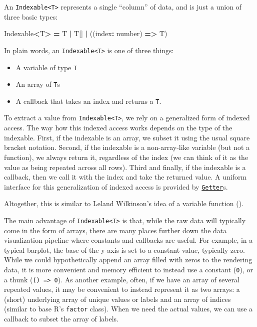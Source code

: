 \documentclass[
]{book}
\newenvironment{Shaded}{\begin{snugshade}}{\end{snugshade}}
\newcommand{\DataTypeTok}[1]{\textcolor[rgb]{0.13,0.29,0.53}{#1}}
\newcommand{\KeywordTok}[1]{\textcolor[rgb]{0.13,0.29,0.53}{\textbf{#1}}}
\newcommand{\NormalTok}[1]{#1}
\newcommand{\OperatorTok}[1]{\textcolor[rgb]{0.81,0.36,0.00}{\textbf{#1}}}
\providecommand{\tightlist}{%
  \setlength{\itemsep}{0pt}\setlength{\parskip}{0pt}}
\theoremstyle{definition}
\theoremstyle{definition}
\theoremstyle{definition}
\theoremstyle{definition}
\theoremstyle{remark}
\begin{document}
An \texttt{Indexable\textless{}T\textgreater{}} represents a single ``column'' of data, and is just a union of three basic types:

\begin{Shaded}
\begin{Highlighting}[]
\NormalTok{Indexable}\OperatorTok{\textless{}}\NormalTok{T}\OperatorTok{\textgreater{}} \OperatorTok{=}\NormalTok{ T }\OperatorTok{|}\NormalTok{ T[] }\OperatorTok{|}\NormalTok{ ((index}\OperatorTok{:} \DataTypeTok{number}\NormalTok{) }\KeywordTok{=\textgreater{}}\NormalTok{ T)}
\end{Highlighting}
\end{Shaded}

In plain words, an \texttt{Indexable\textless{}T\textgreater{}} is one of three things:

\begin{itemize}
\tightlist
\item
  A variable of type \texttt{T}
\item
  An array of \texttt{T}s
\item
  A callback that takes an index and returns a \texttt{T}.
\end{itemize}

To extract a value from \texttt{Indexable\textless{}T\textgreater{}}, we rely on a generalized form of indexed access. The way how this indexed access works depends on the type of the indexable. First, if the indexable is an array, we subset it using the usual square bracket notation. Second, if the indexable is a non-array-like variable (but not a function), we always return it, regardless of the index (we can think of it as the value as being repeated across all rows). Third and finally, if the indexable is a callback, then we call it with the index and take the returned value. A uniform interface for this generalization of indexed access is provided by \hyperref[Getter]{\texttt{Getter}}s.

Altogether, this is similar to Leland Wilkinson's idea of a variable function ().

The main advantage of \texttt{Indexable\textless{}T\textgreater{}} is that, while the raw data will typically come in the form of arrays, there are many places further down the data visualization pipeline where constants and callbacks are useful. For example, in a typical barplot, the base of the y-axis is set to a constant value, typically zero. While we could hypothetically append an array filled with zeros to the rendering data, it is more convenient and memory efficient to instead use a constant (\texttt{0}), or a thunk (\texttt{()\ =\textgreater{}\ 0}). As another example, often, if we have an array of several repeated values, it may be convenient to instead represent it as two arrays: a (short) underlying array of unique values or labels and an array of indices (similar to base R's \texttt{factor} class). When we need the actual values, we can use a callback to subset the array of labels.
\end{document}
